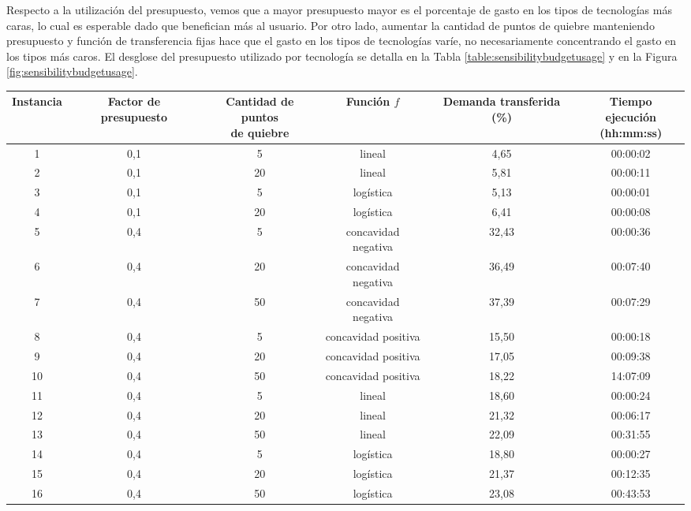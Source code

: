\documentclass{article}
\begin{document}
  Respecto a la utilización del presupuesto, vemos que a mayor presupuesto mayor es el porcentaje de gasto en los tipos de tecnologías más caras, lo cual es esperable dado que benefician más al usuario. Por otro lado, aumentar la cantidad de puntos de quiebre manteniendo presupuesto y función de transferencia fijas hace que el gasto en los tipos de tecnologías varíe, no necesariamente concentrando el gasto en los tipos más caros. El desglose del presupuesto utilizado por tecnología se detalla en la Tabla \ref{table:sensibilitybudgetusage} y en la Figura \ref{fig:sensibilitybudgetusage}.

  \begin{table}
    \centering
    \begin{tabular}{cccccc}
        \toprule
        Instancia & Factor de presupuesto & \shortstack{Cantidad de puntos \\ de quiebre} & Función $f$ & Demanda transferida (\%) & \shortstack{Tiempo ejecución \\ (hh:mm:ss)} \\
        \midrule
        1 & 0,1 & 5 & lineal & 4,65 & 00:00:02 \\
        2 & 0,1 & 20 & lineal & 5,81 & 00:00:11 \\
        3 & 0,1 & 5 & logística & 5,13 & 00:00:01 \\
        4 & 0,1 & 20 & logística & 6,41 & 00:00:08 \\
        5 & 0,4 & 5 & concavidad negativa & 32,43 & 00:00:36 \\
        6 & 0,4 & 20 & concavidad negativa & 36,49 & 00:07:40 \\
        7 & 0,4 & 50 & concavidad negativa & 37,39 & 00:07:29 \\
        8 & 0,4 & 5 & concavidad positiva & 15,50 & 00:00:18 \\
        9 & 0,4 & 20 & concavidad positiva & 17,05 & 00:09:38 \\
        10 & 0,4 & 50 & concavidad positiva & 18,22 & 14:07:09 \\
        11 & 0,4 & 5 & lineal & 18,60 & 00:00:24 \\
        12 & 0,4 & 20 & lineal & 21,32 & 00:06:17 \\
        13 & 0,4 & 50 & lineal & 22,09 & 00:31:55 \\
        14 & 0,4 & 5 & logística & 18,80 & 00:00:27 \\
        15 & 0,4 & 20 & logística & 21,37 & 00:12:35 \\
        16 & 0,4 & 50 & logística & 23,08 & 00:43:53 \\

\end{tabular}
\end{table}
\end{document}
